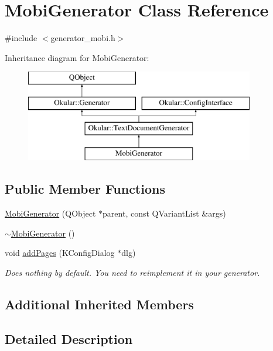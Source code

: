 \hypertarget{classMobiGenerator}{\section{Mobi\+Generator Class Reference}
\label{classMobiGenerator}
}


{\ttfamily \#include $<$generator\+\_\+mobi.\+h$>$}

Inheritance diagram for Mobi\+Generator\+:\begin{figure}[H]
\begin{center}
\leavevmode
\includegraphics[height=4.000000cm]{classMobiGenerator}
\end{center}
\end{figure}
\subsection*{Public Member Functions}
\begin{DoxyCompactItemize}
\item 
\hyperlink{classMobiGenerator_a83e6e0dc4aaaa80b6983c8c789ab7759}{Mobi\+Generator} (Q\+Object $\ast$parent, const Q\+Variant\+List \&args)
\item 
\hyperlink{classMobiGenerator_ada857de9101306dde2cf7726acbfe081}{$\sim$\+Mobi\+Generator} ()
\item 
void \hyperlink{classMobiGenerator_a5121681db8b40d64c87cfc184fdbbf3a}{add\+Pages} (K\+Config\+Dialog $\ast$dlg)
\begin{DoxyCompactList}\small\item\em Does nothing by default. You need to reimplement it in your generator. \end{DoxyCompactList}\end{DoxyCompactItemize}
\subsection*{Additional Inherited Members}


\subsection{Detailed Description}


